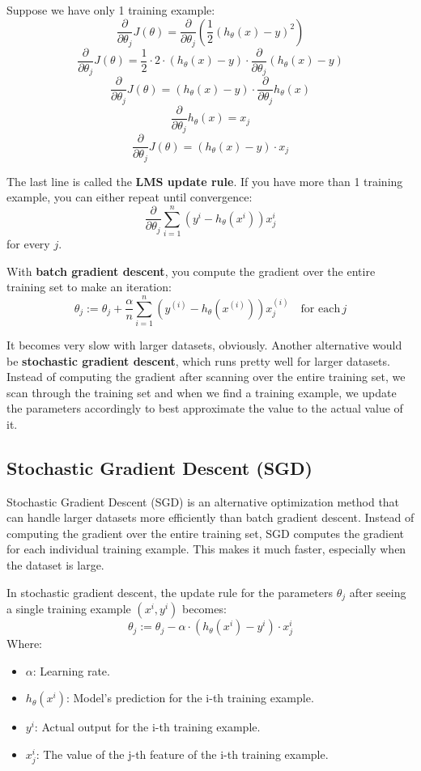\documentclass{book}
\begin{document}
Suppose we have only 1 training example:
\[
\frac{\partial}{\partial \theta_j} J(\theta) = \frac{\partial}{\partial \theta_j} \left( \frac{1}{2} (h_\theta(x) - y)^2 \right)
\]
\[
\frac{\partial}{\partial \theta_j} J(\theta) = \frac{1}{2} \cdot 2 \cdot (h_\theta(x) - y) \cdot \frac{\partial}{\partial \theta_j} (h_\theta(x) - y)
\]
\[
\frac{\partial}{\partial \theta_j} J(\theta) = (h_\theta(x) - y) \cdot \frac{\partial}{\partial \theta_j} h_\theta(x)
\]
\[
\frac{\partial}{\partial \theta_j} h_\theta(x) = x_j
\]
\[
\frac{\partial}{\partial \theta_j} J(\theta) = (h_\theta(x) - y) \cdot x_j
\]

The last line is called the \textbf{LMS update rule}. If you have more than 1 training example, you can either repeat until convergence:
\[
\frac{\partial}{\partial \theta_j} \sum_{i=1}^n (y^i - h_{\theta}(x^i)) x_j^i
\]
for every $j$.

With \textbf{batch gradient descent}, you compute the gradient over the entire training set to make an iteration:
\[
\theta_j := \theta_j + \frac{\alpha}{n} \sum_{i=1}^{n} (y^{(i)} - h_\theta(x^{(i)})) x_j^{(i)} \quad \text{for each} \, j
\]

It becomes very slow with larger datasets, obviously. Another alternative would be \textbf{stochastic gradient descent}, which runs pretty well for larger datasets. Instead of computing the gradient after scanning over the entire training set, we scan through the training set and when we find a training example, we update the parameters accordingly to best approximate the value to the actual value of it.

\subsection{Stochastic Gradient Descent (SGD)}
Stochastic Gradient Descent (SGD) is an alternative optimization method that can handle larger datasets more efficiently than batch gradient descent. Instead of computing the gradient over the entire training set, SGD computes the gradient for each individual training example. This makes it much faster, especially when the dataset is large.

In stochastic gradient descent, the update rule for the parameters $\theta_j$ after seeing a single training example $(x^i, y^i)$ becomes:
\[
\theta_j := \theta_j - \alpha \cdot (h_\theta(x^i) - y^i) \cdot x_j^i
\]
Where:
\begin{itemize}
    \item $\alpha$: Learning rate.
    \item $h_\theta(x^i)$: Model's prediction for the i-th training example.
    \item $y^i$: Actual output for the i-th training example.
    \item $x_j^i$: The value of the j-th feature of the i-th training example.
\end{itemize}
\end{document}
